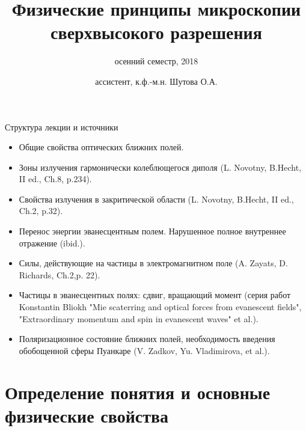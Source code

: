 \documentclass[9pt, compress, xcolor=table]{beamer}
\title{Физические принципы микроскопии сверхвысокого разрешения}
\subtitle{осенний семестр, 2018}
\author{ассистент, к.ф.-м.н. Шутова О.А.}
\institute{МГУ им. М.В. Ломоносова, физический факультет}
\begin{document}
\maketitle


\begin{frame}{Структура лекции и источники}
    
    \begin{itemize}
    \item Общие свойства оптических ближних полей.
    
    \item Зоны излучения гармонически колеблющегося диполя (L. Novotny, B.Hecht, II ed., Ch.8, p.234).
    
    \item Свойства излучения в закритической области (L. Novotny, B.Hecht, II ed., Ch.2, p.32).
    
    \item Перенос энергии эванесцентным полем. Нарушенное полное внутреннее отражение (ibid.).
    
    \item Силы, действующие на частицы в электромагнитном поле (A. Zayats, D. Richards, Ch.2,p. 22). 
    \item Частицы в эванесцентных полях: сдвиг, вращающий момент (серия работ Konstantin Bliokh "Mie scaterring and optical forces from evanescent fields", "Extraordinary momentum and spin in evanescent waves" et al.).
    \item Поляризационное состояние ближних полей, необходимость введения обобощенной сферы Пуанкаре (V. Zadkov, Yu. Vladimirova, et al.).
    
    \end{itemize}
    
\end{frame}

\section{Определение понятия и основные физические свойства}
\end{document}
